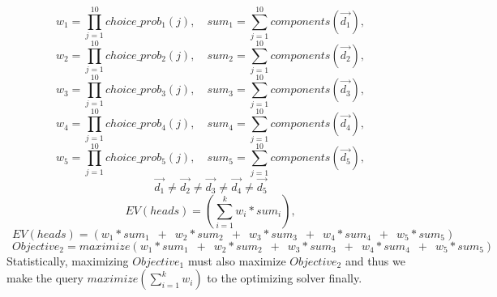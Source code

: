 \documentclass[usenames,dvipsnames,acmsmall]{acmart}
\begin{document}
\begin{equation}	
	w_1 = \prod_{j=1}^{10} choice\_prob_{1}(j) ,
	\quad
	sum_1 = \sum_{j=1}^{10} components(\vec{d_1}) ,
\end{equation}
\begin{equation}	
	w_2 = \prod_{j=1}^{10} choice\_prob_{2}(j) ,
	\quad
	sum_2 = \sum_{j=1}^{10} components(\vec{d_2}) ,
\end{equation}
\begin{equation}	
	w_3 = \prod_{j=1}^{10} choice\_prob_{3}(j) ,
	\quad
	sum_3 = \sum_{j=1}^{10} components(\vec{d_3}) ,
\end{equation}
\begin{equation}	
	w_4 = \prod_{j=1}^{10} choice\_prob_{4}(j) ,
	\quad
	sum_4 = \sum_{j=1}^{10} components(\vec{d_4}) ,
\end{equation}
\begin{equation}	
	w_5 = \prod_{j=1}^{10} choice\_prob_{5}(j) ,
	\quad
	sum_5 = \sum_{j=1}^{10} components(\vec{d_5}) ,
\end{equation}
\begin{equation}
	\vec{d_1} \neq \vec{d_2} \neq \vec{d_3} \neq \vec{d_4} \neq \vec{d_5}
\end{equation}
\begin{equation}
	EV(heads) = (\sum_{i=1}^{k}{w_i * sum_i}),
\end{equation}
\begin{equation}
	\enspace
	EV(heads) = (w_1 * sum_1 \enspace + \enspace w_2 * sum_2 \enspace + \enspace w_3 * sum_3 \enspace + \enspace w_4 * sum_4 \enspace + \enspace w_5 * sum_5)
\end{equation}
\begin{equation}
	\enspace
	Objective_2 = maximize(w_1 * sum_1 \enspace + \enspace w_2 * sum_2 \enspace + \enspace w_3 * sum_3 \enspace + \enspace w_4 * sum_4 \enspace + \enspace w_5 * sum_5)
\end{equation}
Statistically, maximizing $Objective_1$ must also maximize $Objective_2$ and thus we make the query $maximize(\sum_{i=1}^{k}{w_i})$ to the optimizing solver finally.
\end{document}
